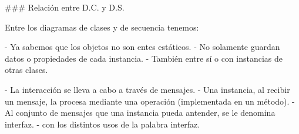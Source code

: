 \centering{}

### Relación entre D.C. y D.S.

Entre los diagramas de clases y de secuencia tenemos:

- Ya sabemos que los objetos no son entes estáticos.
    - No solamente guardan datos o propiedades de cada instancia.
    - También  entre sí o con instancias de otras clases.

- La interacción se lleva a cabo a través de \alert{mensajes}.
    - Una instancia, al recibir un mensaje, la procesa mediante una operación (implementada en
    un método).
    - Al conjunto de mensajes que una instancia pueda antender, se le denomina \alert{interfaz}.
        -  con los distintos usos de la palabra interfaz.
